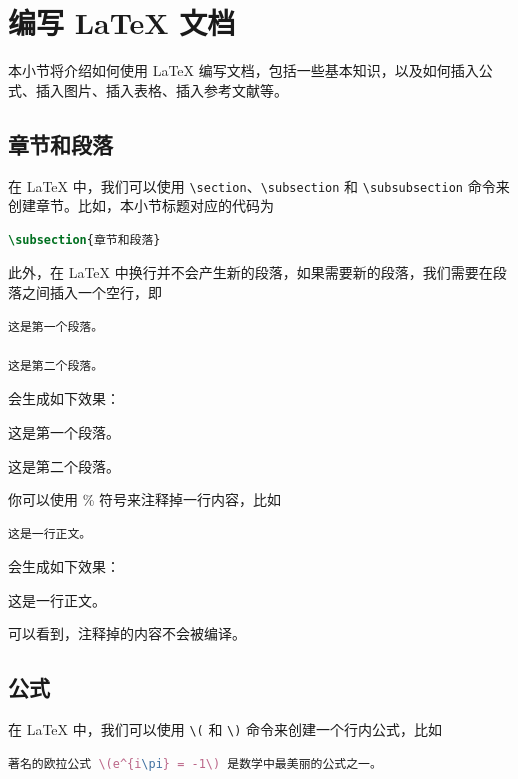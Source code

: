 \section{编写 LaTeX 文档}

本小节将介绍如何使用 LaTeX 编写文档，包括一些基本知识，以及如何插入公式、插入图片、插入表格、插入参考文献等。

\subsection{章节和段落}

在 LaTeX 中，我们可以使用 \texttt{\textbackslash section}、\texttt{\textbackslash subsection} 和 \texttt{\textbackslash subsubsection} 命令来创建章节。比如，本小节标题对应的代码为 

\begin{lstlisting}[language=TeX]
\subsection{章节和段落}
\end{lstlisting}

此外，在 LaTeX 中换行并不会产生新的段落，如果需要新的段落，我们需要在段落之间插入一个空行，即

\begin{lstlisting}[language=TeX]
这是第一个段落。

这是第二个段落。
\end{lstlisting}

\noindent 会生成如下效果：

这是第一个段落。

这是第二个段落。

你可以使用 \% 符号来注释掉一行内容，比如

\begin{lstlisting}[language=TeX]
% 这是一行注释
这是一行正文。
\end{lstlisting}

\noindent 会生成如下效果：

这是一行正文。

可以看到，注释掉的内容不会被编译。

\subsection{公式}
在 LaTeX 中，我们可以使用 \texttt{\textbackslash (} 和 \texttt{\textbackslash )} 命令来创建一个行内公式，比如

\begin{lstlisting}[language=TeX]
著名的欧拉公式 \(e^{i\pi} = -1\) 是数学中最美丽的公式之一。
\end{lstlisting}

